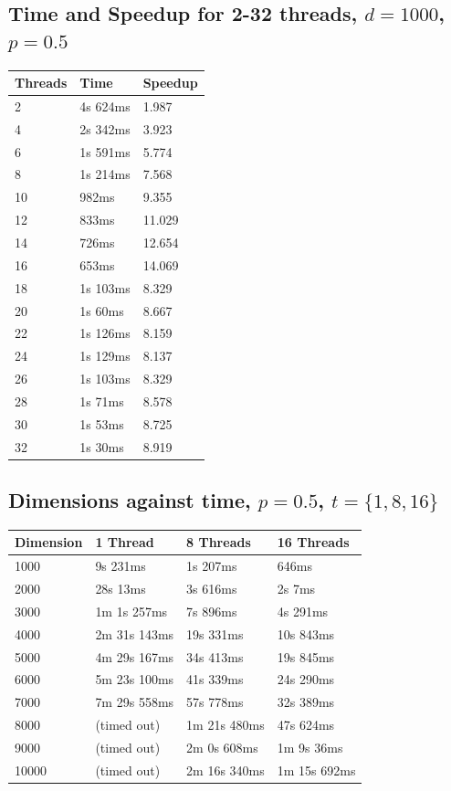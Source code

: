 \documentclass[12pt]{article}
\begin{document}
\begin{appendices}
\subsection{Time and Speedup for 2-32 threads, $d=1000$, $p=0.5$}
\footnotesize{\label{sec:cliff}
\begin{center}
\begin{tabular}{|l|l|l|}
\hline
Threads	& Time & Speedup  \\
\hline
2 & 4s 624ms & 1.987 \\
4 & 2s 342ms & 3.923 \\
6 & 1s 591ms & 5.774 \\
8 & 1s 214ms & 7.568 \\
10 & 982ms & 9.355 \\
12 & 833ms & 11.029 \\
14 & 726ms & 12.654 \\
16 & 653ms & 14.069 \\
18 & 1s 103ms & 8.329 \\
20 & 1s 60ms & 8.667 \\
22 & 1s 126ms & 8.159 \\
24 & 1s 129ms & 8.137 \\
26 & 1s 103ms & 8.329 \\
28 & 1s 71ms & 8.578 \\
30 & 1s 53ms & 8.725 \\
32 & 1s 30ms & 8.919 \\
\hline
\end{tabular}
\end{center}}

\subsection{Dimensions against time, $p=0.5$, $t=\{1, 8, 16\}$}
\footnotesize{\label{sec:dt}
\begin{center}
\begin{tabular}{|l|l|l|l|}
\hline
Dimension & 1 Thread & 8 Threads & 16 Threads \\
\hline
1000 & 9s 231ms & 1s 207ms & 646ms \\
2000 & 28s 13ms & 3s 616ms & 2s 7ms \\
3000 & 1m 1s 257ms & 7s 896ms & 4s 291ms \\
4000 & 2m 31s 143ms & 19s 331ms & 10s 843ms \\
5000 & 4m 29s 167ms & 34s 413ms & 19s 845ms \\
6000 & 5m 23s 100ms & 41s 339ms & 24s 290ms \\
7000 & 7m 29s 558ms & 57s 778ms & 32s 389ms \\
8000 & (timed out) & 1m 21s 480ms & 47s 624ms \\
9000 & (timed out) & 2m 0s 608ms & 1m 9s 36ms \\
10000 & (timed out) & 2m 16s 340ms & 1m 15s 692ms \\
\hline
\end{tabular}
\end{center}}


\end{appendices}
\end{document}
